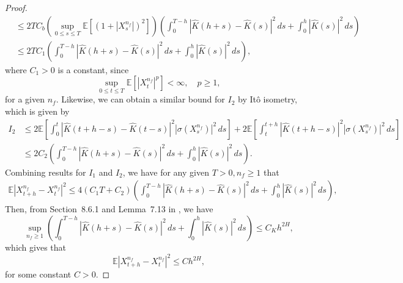 \documentclass[11pt]{article}%
\theoremstyle{definition}
\begin{document}
\begin{proof}
\begin{align*}
        &\le 2TC_b \left(\sup_{0\le s \le T}  \mathbb{E} [(1+|X_s^{n_f}|)^2] \right) \left(\int_{0}^{T-h} |\widehat{K}(h+s)-\widehat{K}(s)|^2\,ds + \int_{0}^{h} |\widehat{K}(s)|^2\,ds \right)\\
        &\le 2TC_1 \left(\int_{0}^{T-h} |\widehat{K}(h+s)-\widehat{K}(s)|^2\,ds + \int_{0}^{h} |\widehat{K}(s)|^2\,ds \right),
    \end{align*}
    where \(C_1>0\) is a constant, since \[
    \sup_{0\le t \le T} \mathbb{E} [|X_t^{n_f}|^p] < \infty,\quad p\ge 1,
    \]
    for a given \(n_f\). Likewise, we can obtain a similar bound for \(I_2\) by It\^o isometry, which is given by 
    \begin{align*}
        I_2 &\le 2\mathbb{E}\left[\int_{0}^{t} |\widehat{K}(t+h-s)-\widehat{K}(t-s)|^2 |\sigma(X_s^{n_f})|^2\,ds\right] + 2\mathbb{E}\left[\int_{t}^{t+h} |\widehat{K}(t+h-s)|^2 |\sigma(X_s^{n_f})|^2\,ds\right]\\
        &\le 2C_2 \left(\int_{0}^{T-h} |\widehat{K}(h+s)-\widehat{K}(s)|^2\,ds + \int_{0}^{h} |\widehat{K}(s)|^2\,ds \right).
    \end{align*}
    Combining results for \(I_1\) and \(I_2\),  we have for any given \(T>0, n_f \ge 1\) that 
    \begin{align*}
        \mathbb{E} |X_{t+h}^{n_f} - X_t^{n_f}|^2 \le 4(C_1 T + C_2) \left(\int_{0}^{T-h} |\widehat{K}(h+s)-\widehat{K}(s)|^2\,ds + \int_{0}^{h} |\widehat{K}(s)|^2\,ds \right),
    \end{align*}
    Then, from Section~8.6.1 and Lemma~7.13 in \cite{abijaber2018}, we have 
    \[
    \sup_{n_f\ge 1} \left(\int_{0}^{T-h} |\widehat{K}(h+s)-\widehat{K}(s)|^2\,ds + \int_{0}^{h} |\widehat{K}(s)|^2\,ds \right) \le C_K h^{2H},
    \]
    which gives that 
    \[
        \mathbb{E} |X_{t+h}^{n_f} - X_t^{n_f}|^2 \le C h^{2H},
    \]
    for some constant \(C>0\).

\end{proof}
\end{document}
